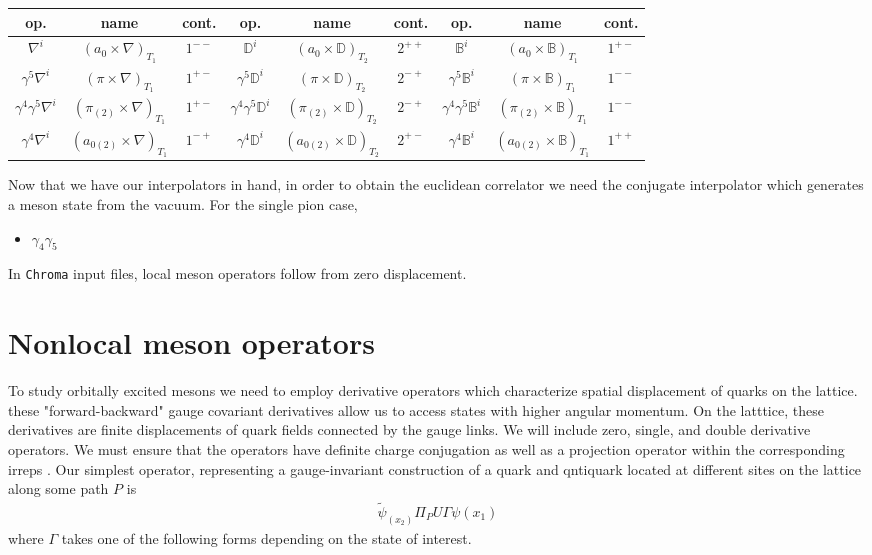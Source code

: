 \begin{tabular}{ccc|ccc|ccc}
    op. & name & cont.  & op. & name & cont. & op. & name & cont.\\
    \hline
    $\nabla^i$ & $(a_0 \times \nabla)_{T_1}$ & $1^{--}$ & $\mathbb{D}^i $ & $(a_0
    \times \mathbb{D})_{T_2}$ & $2^{++}$ & $\mathbb{B}^i$ & $(a_0
    \times \mathbb{B})_{T_1}$ & $1^{+-}$ \\
    $\gamma^5 \nabla^i$ & $(\pi \times \nabla)_{T_1}$ & $1^{+-}$  &
    $\gamma^5 \mathbb{D}^i $ & $(\pi
    \times \mathbb{D})_{T_2}$ & $2^{-+}$ & $\gamma^5 \mathbb{B}^i$ & $(\pi
    \times \mathbb{B})_{T_1}$ & $1^{--}$ \\
    $\gamma^4 \gamma^5 \nabla^i$ & $(\pi_{(2)} \times \nabla)_{T_1}$ &
    $1^{+-}$ & $\gamma^4 \gamma^5 \mathbb{D}^i $ & $(\pi_{(2)}
    \times \mathbb{D})_{T_2}$ & $2^{-+}$ & $\gamma^4 \gamma^5 \mathbb{B}^i$ & $(\pi_{(2)}
    \times \mathbb{B})_{T_1}$ & $1^{--}$ \\
    $\gamma^4 \nabla^i$ & $(a_{0(2)} \times \nabla)_{T_1}$ & $1^{-+}$ &
    $\gamma^4 \mathbb{D}^i $ & $(a_{0(2)}
    \times \mathbb{D})_{T_2}$ & $2^{+-}$ & $\gamma^4 \mathbb{B}^i$ & $(a_{0(2)}
    \times \mathbb{B})_{T_1}$ & $1^{++}$ \\

\end{tabular}

Now that we have our interpolators in hand, in order to obtain the euclidean correlator we need the conjugate interpolator which generates a meson state from the vacuum. For the single pion case, 
\begin{itemize}
    \item $\gamma_4\gamma_5$

\end{itemize}
In \texttt{Chroma} input files, local meson operators follow from zero displacement. 

\section{Nonlocal meson operators}
To study orbitally excited mesons we need to employ derivative operators which characterize spatial displacement of quarks on the lattice.
these "forward-backward" gauge covariant derivatives allow us to access states with higher angular momentum. On the latttice, these derivatives are finite displacements of quark fields connected by the gauge links. We will include zero, single, and double derivative operators. We must ensure that the operators have definite charge conjugation as well as a projection operator within the corresponding irreps \cite{liao2002excitedcharmoniumspectrumanisotropic}. Our simplest operator, representing a gauge-invariant construction of a quark and qntiquark located at different sites on the lattice along some path $P$ is 
\begin{align}
    \tilde{\psi}_(x_2)\Pi_P U \Gamma \psi(x_1)
\end{align}
where $\Gamma$ takes one of the following forms depending on the state of interest. 

